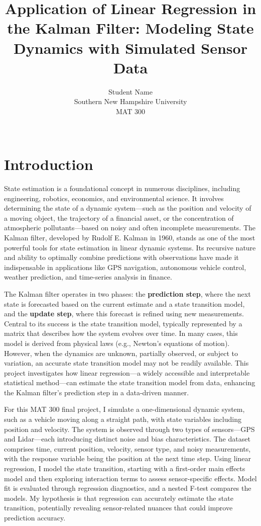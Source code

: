 \documentclass[12pt]{article}
\title{Application of Linear Regression in the Kalman Filter: Modeling State Dynamics with Simulated Sensor Data}
\author{Student Name \\ Southern New Hampshire University \\ MAT 300 \\ [Course Instructor] \\ [Submission Date]}
\date{}
\begin{document}

\tableofcontents
\newpage

\section{Introduction}
\label{sec:introduction}

State estimation is a foundational concept in numerous disciplines, including engineering, robotics, economics, and environmental science. It involves determining the state of a dynamic system—such as the position and velocity of a moving object, the trajectory of a financial asset, or the concentration of atmospheric pollutants—based on noisy and often incomplete measurements. The Kalman filter, developed by Rudolf E. Kalman in 1960, stands as one of the most powerful tools for state estimation in linear dynamic systems. Its recursive nature and ability to optimally combine predictions with observations have made it indispensable in applications like GPS navigation, autonomous vehicle control, weather prediction, and time-series analysis in finance.

The Kalman filter operates in two phases: the \textbf{prediction step}, where the next state is forecasted based on the current estimate and a state transition model, and the \textbf{update step}, where this forecast is refined using new measurements. Central to its success is the state transition model, typically represented by a matrix that describes how the system evolves over time. In many cases, this model is derived from physical laws (e.g., Newton’s equations of motion). However, when the dynamics are unknown, partially observed, or subject to variation, an accurate state transition model may not be readily available. This project investigates how linear regression—a widely accessible and interpretable statistical method—can estimate the state transition model from data, enhancing the Kalman filter’s prediction step in a data-driven manner.

For this MAT 300 final project, I simulate a one-dimensional dynamic system, such as a vehicle moving along a straight path, with state variables including position and velocity. The system is observed through two types of sensors—GPS and Lidar—each introducing distinct noise and bias characteristics. The dataset comprises time, current position, velocity, sensor type, and noisy measurements, with the response variable being the position at the next time step. Using linear regression, I model the state transition, starting with a first-order main effects model and then exploring interaction terms to assess sensor-specific effects. Model fit is evaluated through regression diagnostics, and a nested F-test compares the models. My hypothesis is that regression can accurately estimate the state transition, potentially revealing sensor-related nuances that could improve prediction accuracy.
\end{document}
